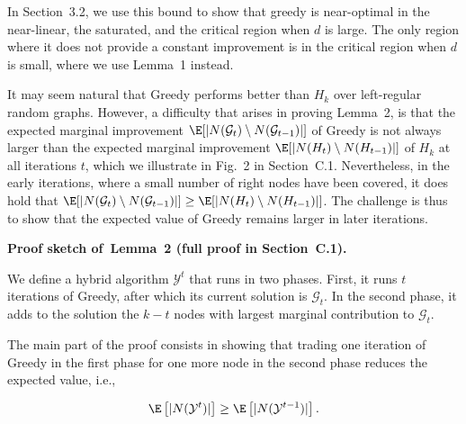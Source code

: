 \documentclass[10pt,a4paper]{article}
\begin{document}
In Section 3.2, we use this bound to show that greedy is near-optimal in the near-linear, the saturated, and the critical region when $d$ is large.
The only region where it does not provide a constant improvement is in the critical region when $d$ is small, where we use Lemma 1 instead.\par




It may seem natural that Greedy performs better than $H_{k}$ over left-regular random graphs. However, a difficulty that arises in proving Lemma 2, is that the expected marginal improvement $\E[|N(\mathcal{G}_{t})\setminus N(\mathcal{G}_{t-1})|]$ of Greedy is not always larger than the expected marginal improvement $\E[|N(H_{t})\setminus N(H_{t-1})|]$ of $H_{k}$ at all iterations $t$, which we illustrate in Fig. 2 in Section C.1.
Nevertheless, in the early iterations, where a small number of right nodes have been covered, it does hold that $\E[|N(\mathcal{G}_{t})\setminus N(\mathcal{G}_{t-1})|]\geq\E[|N(H_{t})\setminus N(H_{t-1})|]$. The challenge is thus to show that the expected value of Greedy remains larger in later iterations.\par




\par\medskip\noindent\textbf{Proof sketch of Lemma 2 (full proof in Section C.1).}\par



We define a hybrid algorithm $\mathcal{Y}^{t}$ that runs in two phases. First, it runs $t$ iterations of Greedy, after which its current solution is $\mathcal{G}_{t}$. In the second phase, it adds to the solution the $k-t$ nodes with largest marginal contribution to $\mathcal{G}_{t}$.\par




The main part of the proof consists in showing that trading one iteration of Greedy in the first phase for one more node in the second phase reduces the expected value, i.e.,\par


\[\begin{gathered}
\E\left[|N(\mathcal{Y}^{t})|\right]\geq\E\left[|N(\mathcal{Y}^{t-1})|\right].
\end{gathered}\]
\end{document}
